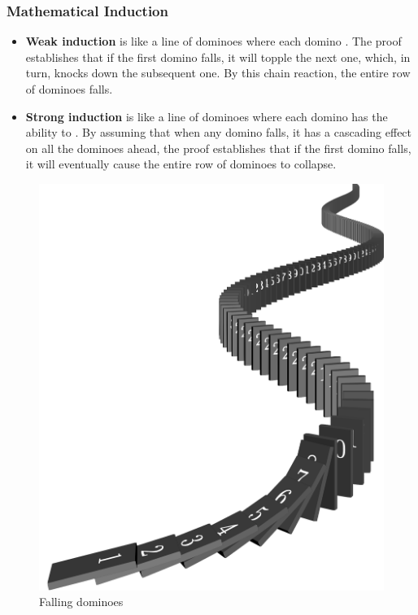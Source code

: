 \documentclass{beamer}
\begin{document}
\begin{frame}[fragile]
    \frametitle{Mathematical Induction}

    \begin{minipage}[b]{0.60\textwidth}
        \small
        \begin{itemize}
            \item \textbf{Weak induction} is like a line of dominoes where each domino
            . The proof establishes that if the first domino falls, 
            it will topple the next one, which, in turn, knocks down the subsequent one. 
            By this chain reaction, the entire row of dominoes falls.
            \item \textbf{Strong induction} is like a line of dominoes where each domino has the ability 
            to . 
            By assuming that when any domino falls, it has a cascading effect on all 
            the dominoes ahead, the proof establishes that if the first domino falls, 
            it will eventually cause the entire row of dominoes to collapse.
        \end{itemize}
    \end{minipage}
    \hspace{-2mm}
    \begin{minipage}[b]{0.32\textwidth}
        \begin{figure}
            \centering
            \includegraphics[width=1\textwidth]{domino.png}
            \caption{Falling dominoes}
        \end{figure}

        \vspace{2em}

    \end{minipage}

\end{frame}
\end{document}
